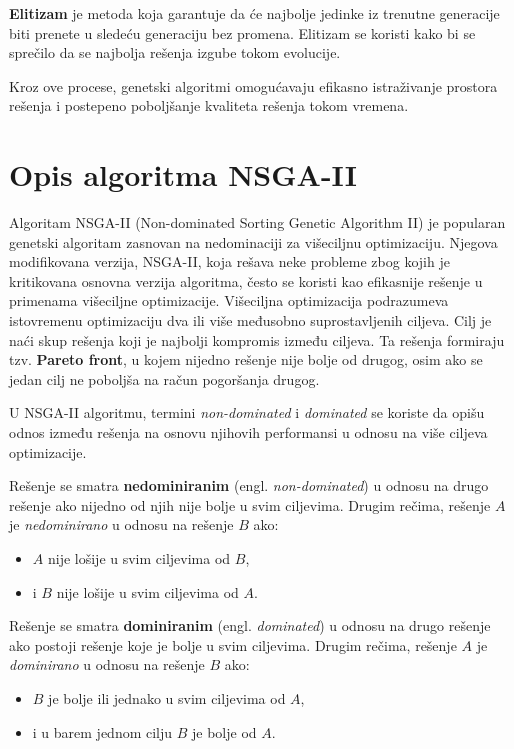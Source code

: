 \documentclass[12pt]{article}
\begin{document}
\textbf{Elitizam} je metoda koja garantuje da će najbolje jedinke iz trenutne generacije biti prenete u sledeću generaciju bez promena. Elitizam se koristi kako bi se sprečilo da se najbolja rešenja izgube tokom evolucije.

Kroz ove procese, genetski algoritmi omogućavaju efikasno istraživanje prostora rešenja i postepeno poboljšanje kvaliteta rešenja tokom vremena.

\section{Opis algoritma NSGA-II}
Algoritam NSGA-II (Non-dominated Sorting Genetic Algorithm II)  je popularan genetski algoritam zasnovan na nedominaciji za višeciljnu optimizaciju. Njegova modifikovana verzija, NSGA-II, koja rešava neke probleme zbog kojih je kritikovana osnovna verzija algoritma, često se koristi kao efikasnije rešenje u primenama višeciljne optimizacije.
Višeciljna optimizacija podrazumeva istovremenu optimizaciju dva ili više međusobno suprostavljenih ciljeva. Cilj je naći skup rešenja koji je najbolji kompromis između ciljeva. Ta rešenja formiraju tzv. \textbf{Pareto front}, u kojem nijedno rešenje nije bolje od drugog, osim ako se jedan cilj ne poboljša na račun pogoršanja drugog.

U NSGA-II algoritmu, termini \textit{non-dominated} i \textit{dominated} se koriste da opišu odnos između rešenja na osnovu njihovih performansi u odnosu na više ciljeva optimizacije.

Rešenje se smatra \textbf{nedominiranim} (engl. \textit{non-dominated}) u odnosu na drugo rešenje ako nijedno od njih nije bolje u svim ciljevima. Drugim rečima, rešenje \(A\) je \textit{nedominirano} u odnosu na rešenje \(B\) ako:

\begin{itemize}
    \item \(A\) nije lošije u svim ciljevima od \(B\),
    \item i \(B\) nije lošije u svim ciljevima od \(A\).
\end{itemize}

Rešenje se smatra \textbf{dominiranim} (engl. \textit{dominated}) u odnosu na drugo rešenje ako postoji rešenje koje je bolje u svim ciljevima. Drugim rečima, rešenje \(A\) je \textit{dominirano} u odnosu na rešenje \(B\) ako:

\begin{itemize}
    \item \(B\) je bolje ili jednako u svim ciljevima od \(A\),
    \item i u barem jednom cilju \(B\) je bolje od \(A\).
\end{itemize}
\end{document}
